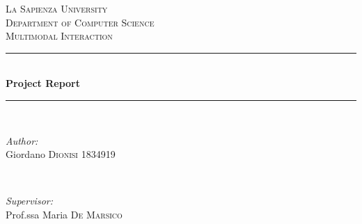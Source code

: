 \documentclass[12pt]{article}
\begin{document}
\begin{titlepage}

\newcommand{\HRule}{\rule{\linewidth}{0.5mm}} %

\center %
 

\textsc{\LARGE La Sapienza University}\\[1.5cm] %
\textsc{\Large Department of Computer Science}\\[0.5cm] %
\textsc{\large Multimodal Interaction}\\[0.5cm] %


\HRule \\[0.4cm]
{ \huge \bfseries Project Report}\\[0.4cm] %
\HRule \\[1.5cm]
 

\begin{minipage}{0.4\textwidth}
\begin{flushleft} \large
\emph{Author:}\\
Giordano \textsc{Dionisi} 1834919 

\end{flushleft}
\end{minipage}
~
\begin{minipage}{0.4\textwidth}
\begin{flushright} \large
\emph{Supervisor:} \\
Prof.ssa Maria \textsc{De Marsico} %

\end{flushright}
\end{minipage}\\[2cm]


\end{titlepage}
\end{document}
